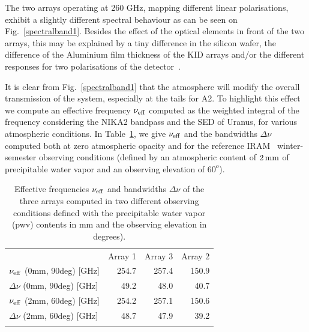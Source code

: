 The two arrays operating at 260 GHz, mapping different linear polarisations,
exhibit a slightly different spectral behaviour as can be
seen on Fig.~\ref{spectralband1}. {\lp Besides the effect of the
optical elements in front of the two arrays, this may be explained by
a tiny difference in the silicon wafer, the difference of the
Aluminium film thickness of the KID arrays and/or the different
responses for two polarisations of the
detector~\citep{Adam2018, Shu2018_bandpass}.}

It is clear from Fig.~\ref{spectralband1} that the atmosphere will
modify the overall transmission of the system, especially at the tails
for A2. {\lp To highlight this effect we compute an effective
frequency $\nu_{\rm{eff}}$ computed as the weighted integral of the
frequency considering the NIKA2 bandpass and the SED of Uranus, for
various atmospheric conditions.}
In Table~\ref{tab:frequencies}, we give $\nu_{\rm{eff}}$ and the
bandwidths $\Delta \nu$ computed both at zero atmospheric opacity and for the
reference IRAM \trentemetre\ winter-semester observing conditions
(defined by an atmospheric content of $2\,\rm{mm}$ of precipitable
water vapor and an observing elevation of $60^o$).

\begin{table}[!htbp]
  \caption[]{Effective frequencies $\nu_{\rm{eff}}$ and bandwidths
    $\Delta \nu$
    of the three arrays computed in two different observing conditions
    defined with the precipitable water vapor (pwv) contents in mm and
    the observing elevation in degrees).}
  \label{tab:frequencies}
  \centering    
  \begin{tabular}{lrrr}
    \hline\hline
    \noalign{\smallskip}
    & Array 1 & Array 3 & Array 2 \\
    \noalign{\smallskip}
    \hline
    \noalign{\smallskip}
    $\nu_{\rm{eff}}$ \small{(0mm, 90deg)} [GHz] & 254.7 & 257.4 &  150.9 \\
    $\Delta \nu$ \small{(0mm, 90deg)} [GHz] &  49.2 & 48.0  &   40.7 \\
    $\nu_{\rm{eff}}$ \small{(2mm, 60deg)} [GHz] & 254.2 & 257.1 &  150.6 \\
    $\Delta \nu$ \small{(2mm, 60deg)} [GHz] &  48.7 &  47.9 &    39.2 \\
    \noalign{\smallskip}
    \hline
  \end{tabular}
\end{table}

